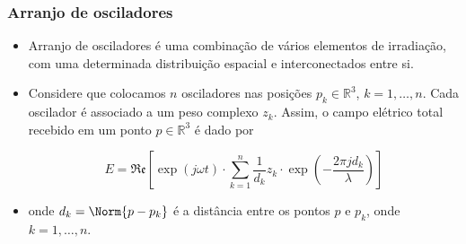 \begin{frame}
\frametitle{Arranjo de osciladores}
\begin{itemize}


\item Arranjo de osciladores é uma combinação de vários elementos de irradiação, com uma determinada distribuição espacial e interconectados entre si.

\item Considere que colocamos $n$ osciladores nas posi\c{c}\~oes $p_{k} \in \mathbb{R}^{3}$, $k = 1, \ldots, n$. Cada oscilador é associado a um peso complexo $z_{k}$. Assim, o campo elétrico total recebido em um ponto $p \in \mathbb{R}^{3}$ é dado por

\begin{equation}
E = \mathfrak{Re}\left[ \exp\left( j\omega t \right) \cdot \sum_{k = 1}^{n} \frac{1}{d_{k}} z_{k} \cdot \exp \left( - \frac{2 \pi j d_{k}}{\lambda}  \right) \right]
\end{equation}

\item onde $d_{k} = \Norm{p - p_{k}}$ é a distância entre os pontos $p$ e $p_{k}$, onde $ k = 1, \ldots, n$.

\end{itemize}
\end{frame}


